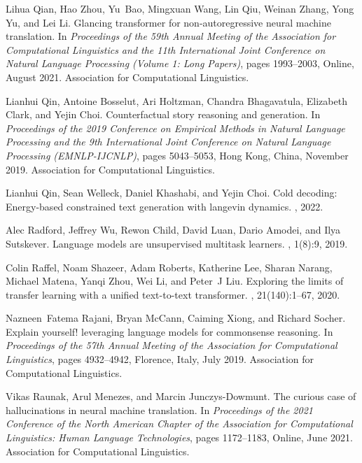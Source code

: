 \documentclass[11pt]{article}
\begin{document}
\begin{thebibliography}{100}
Lihua Qian, Hao Zhou, Yu~Bao, Mingxuan Wang, Lin Qiu, Weinan Zhang, Yong Yu,
  and Lei Li.
\newblock Glancing transformer for non-autoregressive neural machine
  translation.
\newblock In {\em Proceedings of the 59th Annual Meeting of the Association for
  Computational Linguistics and the 11th International Joint Conference on
  Natural Language Processing (Volume 1: Long Papers)}, pages 1993--2003,
  Online, August 2021. Association for Computational Linguistics.

Lianhui Qin, Antoine Bosselut, Ari Holtzman, Chandra Bhagavatula, Elizabeth
  Clark, and Yejin Choi.
\newblock Counterfactual story reasoning and generation.
\newblock In {\em Proceedings of the 2019 Conference on Empirical Methods in
  Natural Language Processing and the 9th International Joint Conference on
  Natural Language Processing (EMNLP-IJCNLP)}, pages 5043--5053, Hong Kong,
  China, November 2019. Association for Computational Linguistics.

Lianhui Qin, Sean Welleck, Daniel Khashabi, and Yejin Choi.
\newblock Cold decoding: Energy-based constrained text generation with langevin
  dynamics.
, 2022.

Alec Radford, Jeffrey Wu, Rewon Child, David Luan, Dario Amodei, and Ilya
  Sutskever.
\newblock Language models are unsupervised multitask learners.
, 1(8):9, 2019.

Colin Raffel, Noam Shazeer, Adam Roberts, Katherine Lee, Sharan Narang, Michael
  Matena, Yanqi Zhou, Wei Li, and Peter~J Liu.
\newblock Exploring the limits of transfer learning with a unified text-to-text
  transformer.
, 21(140):1--67, 2020.

Nazneen~Fatema Rajani, Bryan McCann, Caiming Xiong, and Richard Socher.
\newblock Explain yourself! leveraging language models for commonsense
  reasoning.
\newblock In {\em Proceedings of the 57th Annual Meeting of the Association for
  Computational Linguistics}, pages 4932--4942, Florence, Italy, July 2019.
  Association for Computational Linguistics.

Vikas Raunak, Arul Menezes, and Marcin Junczys-Dowmunt.
\newblock The curious case of hallucinations in neural machine translation.
\newblock In {\em Proceedings of the 2021 Conference of the North American
  Chapter of the Association for Computational Linguistics: Human Language
  Technologies}, pages 1172--1183, Online, June 2021. Association for
  Computational Linguistics.


\end{thebibliography}
\end{document}
